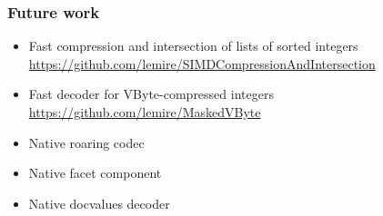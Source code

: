\documentclass{beamer}
\begin{document}
	\begin{frame}
		\frametitle{Future work}
		\begin{itemize}
			\item Fast compression and intersection of lists of sorted integers \url{https://github.com/lemire/SIMDCompressionAndIntersection}
			\item Fast decoder for VByte-compressed integers \url{https://github.com/lemire/MaskedVByte}
			\item Native roaring codec
			\item Native facet component
			\item Native docvalues decoder
		\end{itemize}
	\end{frame}
\end{document}

